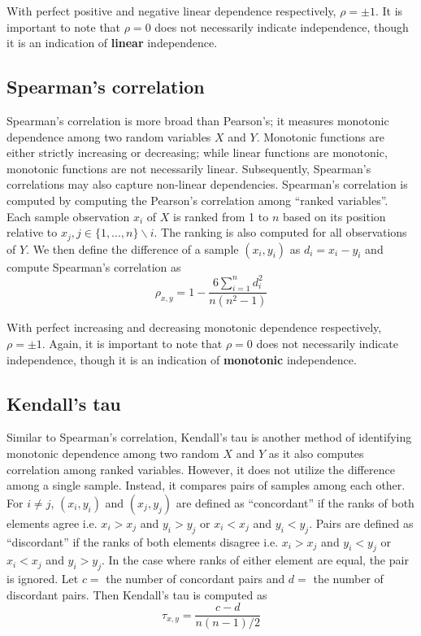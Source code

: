 With perfect positive and negative linear dependence respectively, $\rho=\pm1$.
It is important to note that $\rho=0$ does not necessarily indicate
independence, though it is an indication of \textbf{linear} independence.

\subsection{Spearman's correlation}

Spearman's correlation is more broad than Pearson's; it measures monotonic
dependence among two random variables $X$ and $Y$. Monotonic functions are
either strictly increasing or decreasing; while linear functions are monotonic,
monotonic functions are not necessarily linear. Subsequently, Spearman's
correlations may also capture non-linear dependencies. Spearman's correlation is
computed by computing the Pearson's correlation among ``ranked variables''. Each
sample observation $x_i$ of $X$ is ranked from 1 to $n$ based on its position
relative to $x_j, j\in\{1,...,n\}\backslash{i}$. The ranking is also computed
for all observations of $Y$. We then define the difference of a sample
$(x_i,y_i)$ as $d_i=x_i-y_i$ and compute Spearman's correlation as
$$\rho_{x,y}=1-\frac{6 \sum\limits_{i=1}^{n}d_i^2}{n(n^2-1)}$$

With perfect increasing and decreasing monotonic dependence respectively,
$\rho=\pm1$. Again, it is important to note that $\rho=0$ does not necessarily
indicate independence, though it is an indication of \textbf{monotonic}
independence.

\subsection{Kendall's tau}

Similar to Spearman's correlation, Kendall's tau is another method of
identifying monotonic dependence among two random $X$ and $Y$ as it also
computes correlation among ranked variables. However, it does not utilize the
difference among a single sample. Instead, it compares pairs of samples among
each other. For $i\not=j$, $(x_i,y_i)$ and $(x_j,y_j)$ are defined as
``concordant'' if the ranks of both elements agree i.e. $x_i > x_j$ and $y_i >
y_j$ or $x_i < x_j$ and $y_i < y_j$. Pairs are defined as ``discordant'' if the
ranks of both elements disagree i.e. $x_i > x_j$ and $y_i < y_j$ or $x_i < x_j$
and $y_i > y_j$. In the case where ranks of either element are equal, the pair
is ignored. Let $c=$ the number of concordant pairs and $d=$ the number of
discordant pairs. Then Kendall's tau is computed as 
$$\tau_{x,y}=\frac{c-d}{n(n-1)/2}$$

